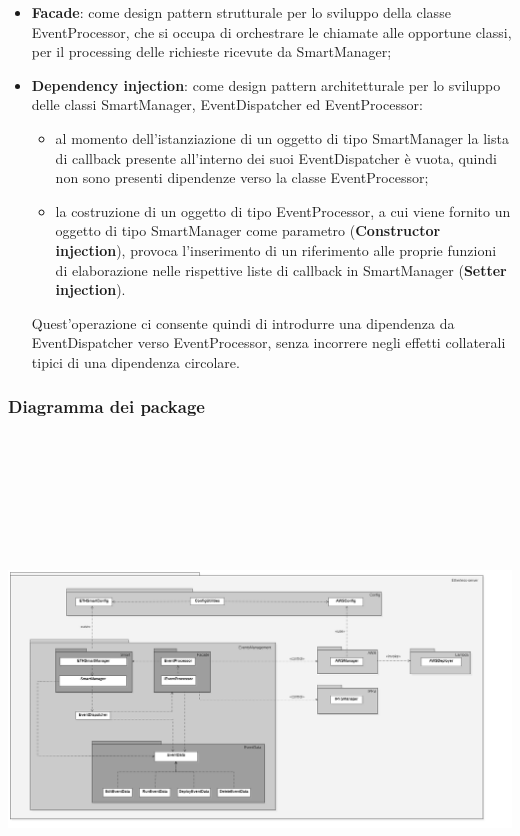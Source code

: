 \begin{itemize}
	\item \textbf{Facade}: come design pattern strutturale per lo sviluppo della classe EventProcessor, che si occupa di orchestrare le chiamate alle opportune classi, per il processing delle richieste ricevute da SmartManager;
	\item \textbf{Dependency injection}: come design pattern architetturale per lo sviluppo delle classi SmartManager, EventDispatcher ed EventProcessor: 
	\begin{itemize}
		\item al momento dell'istanziazione di un oggetto di tipo SmartManager la lista di callback presente all'interno dei suoi EventDispatcher è vuota, quindi non sono presenti dipendenze verso la classe EventProcessor;
		\item la costruzione di un oggetto di tipo EventProcessor, a cui viene fornito un oggetto di tipo SmartManager come parametro (\textbf{Constructor injection}), provoca l'inserimento di un riferimento alle proprie funzioni di elaborazione nelle rispettive liste di callback in SmartManager (\textbf{Setter injection}).
	\end{itemize}
	Quest'operazione ci consente quindi di introdurre una dipendenza da EventDispatcher verso EventProcessor, senza incorrere negli effetti collaterali tipici di una dipendenza circolare.
\end{itemize}
\begin{landscape}
\subsubsection{Diagramma dei package}
	\includegraphics[width=24cm, height=14cm]{././diagrammi/etherless-server/Etherless-server-package.png}
\end{landscape}
